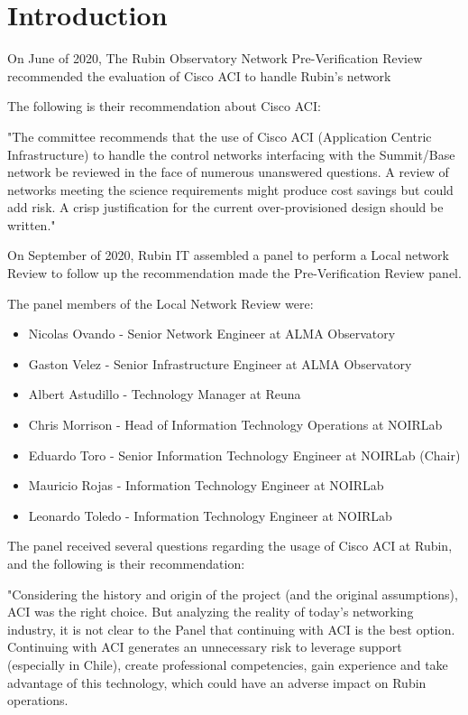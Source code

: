 \section{Introduction}

On June of 2020, The Rubin Observatory Network Pre-Verification Review recommended the evaluation of Cisco ACI to handle Rubin's network

The following is their recommendation about Cisco ACI: 

"The committee recommends that the use of Cisco ACI (Application Centric Infrastructure) to handle the control networks interfacing with the Summit/Base network be reviewed in the face of numerous unanswered questions. A review of networks meeting the science requirements might produce cost savings but could add risk. A crisp justification for the current over-provisioned design should be written."

On September of 2020, Rubin IT assembled a panel to perform a Local network Review to follow up the recommendation made the Pre-Verification Review panel.

The panel members of the Local Network Review were:

\begin{itemize}
\item Nicolas Ovando - Senior Network Engineer at ALMA Observatory
\item Gaston Velez - Senior Infrastructure Engineer at ALMA Observatory
\item Albert Astudillo - Technology Manager at Reuna
\item Chris Morrison - Head of Information Technology Operations at NOIRLab \item Eduardo Toro - Senior Information Technology Engineer at NOIRLab (Chair) \item Mauricio Rojas - Information Technology Engineer at NOIRLab 
\item Leonardo Toledo - Information Technology Engineer at NOIRLab 
\end{itemize}

The panel received several questions regarding the usage of Cisco ACI at Rubin, and the following is their recommendation:

"Considering the history and origin of the project (and the original assumptions), ACI was the right choice. But analyzing the reality of today’s networking industry, it is not clear to the Panel that continuing with ACI is the best option. Continuing with ACI generates an unnecessary risk to leverage support (especially in Chile), create professional competencies, gain experience and take advantage of this technology, which could have an adverse impact on Rubin operations.

